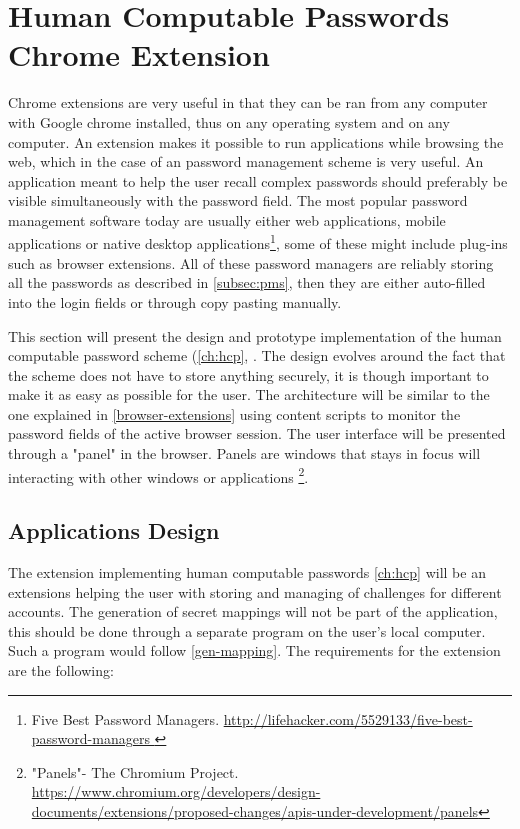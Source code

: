 \section{Human Computable Passwords Chrome Extension}
Chrome extensions are very useful in that they can be ran from any computer with Google chrome installed, thus on any operating system and on any computer. An extension makes it possible to run applications while browsing the web, which in the case of an password management scheme is very useful. An application meant to help the user recall complex passwords should preferably be visible simultaneously with the password field. The most popular password management software today are usually either web applications, mobile applications or native desktop applications\footnote{Five Best Password Managers. \url{ http://lifehacker.com/5529133/five-best-password-managers }}, some of these might include plug-ins such as browser extensions. All of these password managers are reliably storing all the passwords as described in \autoref{subsec:pms}, then they are either auto-filled into the login fields or through copy pasting manually. 
\par This section will present the design and prototype implementation of the human computable password scheme (\autoref{ch:hcp}, \cite{hcp-blocki}. The design evolves around the fact that the scheme does not have to store anything securely, it is though important to make it as easy as possible for the user. The architecture will be similar to the one explained in \autoref{browser-extensions} using content scripts to monitor the password fields of the active browser session. The user interface will be presented through a "panel" in the browser. Panels are windows that stays in focus will interacting with other windows or applications \footnote{"Panels"- The Chromium Project. \url{https://www.chromium.org/developers/design-documents/extensions/proposed-changes/apis-under-development/panels}}. 




\subsection{Applications Design}
The extension implementing human computable passwords \ref{ch:hcp} will be an extensions helping the user with storing and managing of challenges for different accounts. The generation of secret mappings will not be part of the application, this should be done through a separate program on the user's local computer. Such a program would follow \autoref{gen-mapping}. The requirements for the extension are the following:

